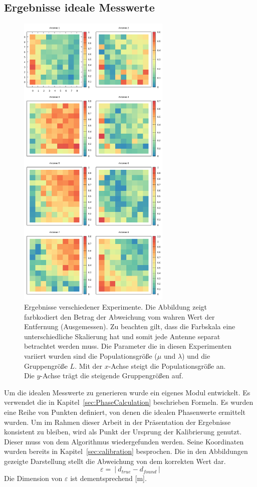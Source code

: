 \subsection{Ergebnisse ideale Messwerte}
%
\begin{figure}[h!]
	\centering
	\caption[Ergebnis-Heatmap - Idealisierte Werte]{ Ergebnisse verschiedener Experimente. Die Abbildung zeigt farbkodiert den Betrag der Abweichung vom wahren Wert der Entfernung (Ausgemessen). Zu beachten gilt, dass die Farbskala eine unterschiedliche Skalierung hat und somit jede Antenne separat betrachtet werden muss. Die Parameter die in diesen Experimenten variiert wurden sind die Populationsgröße ($\mu$ und $\lambda$) und die Gruppengröße $L$. Mit der $x$-Achse steigt die Populationsgröße an. Die $y$-Achse trägt die steigende Gruppengrößen auf.}
	\label{fig:results1}
	\includegraphics[width=0.65\textwidth]{img/result.png}
\end{figure}
% 
Um die idealen Messwerte zu generieren wurde ein eigenes Modul entwickelt. Es verwendet die in Kapitel~\ref{sec:PhaseCalculation} beschrieben Formeln. Es wurden eine Reihe von Punkten definiert, von denen die idealen Phasenwerte ermittelt wurden. Um im Rahmen dieser Arbeit in der Präsentation der Ergebnisse konsistent zu bleiben, wird als Punkt der Ursprung der Kalibrierung genutzt. Dieser muss von dem Algorithmus wiedergefunden werden. Seine Koordinaten wurden bereits in Kapitel~\ref{sec:calibration} besprochen. Die in den Abbildungen gezeigte Darstellung stellt die Abweichung von dem korrekten Wert dar.
$$
\varepsilon=~|~d_{true}-d_{found}~|
$$
Die Dimension von $\varepsilon$ ist dementsprechend [m].
%
